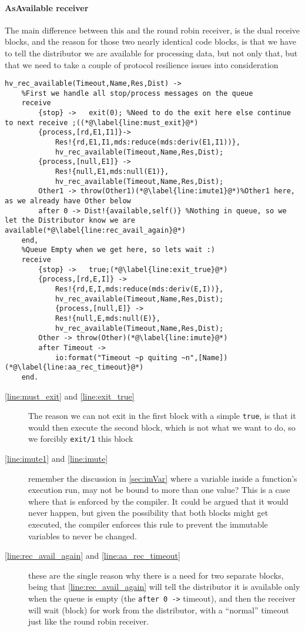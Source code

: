 \paragraph{AsAvailable receiver}

The main difference between this and the round robin receiver, is the
dual receive blocks, and the reason for those two nearly identical
code blocks, is  that we have to tell the distributor we are available
for processing data, but not only that, but that we need to take a
couple of protocol resilience issues into consideration

\begin{lstlisting}[name=hvp2]
hv_rec_available(Timeout,Name,Res,Dist) ->
	%First we handle all stop/process messages on the queue
	receive
		{stop} ->	exit(0); %Need to do the exit here else continue to next receive ;((*@\label{line:must_exit}@*)
		{process,[rd,E1,I1]}-> 
			Res!{rd,E1,I1,mds:reduce(mds:deriv(E1,I1))},
			hv_rec_available(Timeout,Name,Res,Dist);
		{process,[null,E1]} ->
			Res!{null,E1,mds:null(E1)},
			hv_rec_available(Timeout,Name,Res,Dist);
		Other1 -> throw(Other1)(*@\label{line:imute1}@*)%Other1 here, as we already have Other below
		after 0 -> Dist!{available,self()} %Nothing in queue, so we let the Distributor know we are available(*@\label{line:rec_avail_again}@*)
	end,
	%Queue Empty when we get here, so lets wait :)
	receive
		{stop} ->	true;(*@\label{line:exit_true}@*)
		{process,[rd,E,I]} ->
			Res!{rd,E,I,mds:reduce(mds:deriv(E,I))},
			hv_rec_available(Timeout,Name,Res,Dist);
      		{process,[null,E]} ->
			Res!{null,E,mds:null(E)},
			hv_rec_available(Timeout,Name,Res,Dist);
		Other -> throw(Other)(*@\label{line:imute}@*)
		after Timeout ->
			io:format("Timeout ~p quiting ~n",[Name])(*@\label{line:aa_rec_timeout}@*)
	end.
\end{lstlisting}
\begin{description}
  \item[\autoref{line:must_exit} and \ref{line:exit_true}] The reason
    we can not exit in the first block with a simple \texttt{true}, is
    that it would then execute the second block, which is not what we
    want to do, so we forcibly \texttt{exit/1} this block
  \item[\autoref{line:imute1} and \ref{line:imute}] remember the
    discussion in \autoref{sec:imVar} where a variable inside a
    function's execution run, may not be bound to more than one value?
    This is a case where that is enforced by the compiler. It could be
    argued that it would never happen, but given the possibility that
    both blocks might get executed, the compiler enforces this rule to
    prevent the immutable variables to never be changed.
  \item[\autoref{line:rec_avail_again} and \ref{line:aa_rec_timeout}]
    these are the single reason why there is a need for two separate
    blocks, being that \autoref{line:rec_avail_again} will tell the
    distributor it is available only when the queue is empty (the
    \texttt{after 0 ->} timeout), and then the receiver will wait
    (block) for work from the distributor, with a ``normal'' timeout
    just like the round robin receiver.
\end{description}

